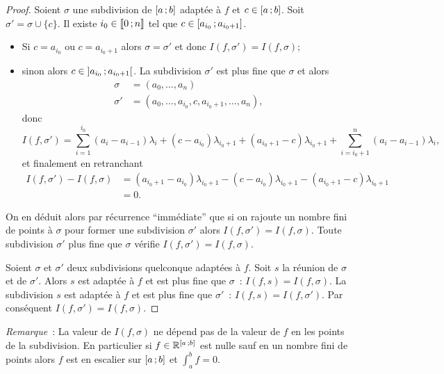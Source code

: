 \begin{proof}
  Soient \(\sigma\) une subdivision de \(\left[ a \, ; {} b \right]\) adaptée à \(f\)
  et \(c \in \left[ a \, ; {} b \right]\). Soit \(\sigma' = \sigma \cup \{c\}\). Il
  existe \(i_0 \in \mathopen{\llbracket}0\mathclose{}\mathpunct{};n\mathclose{\rrbracket}\) tel que \(c \in
  \left[ a_{i_0} \, ; {} a_{i_0+1} \right]\).
  \begin{itemize}
    \item Si \(c=a_{i_0}\) ou \(c=a_{i_0+1}\) alors \(\sigma=\sigma'\) et donc
      \(I(f,\sigma')=I(f,\sigma)\);
    \item sinon alors \(c \in \left] a_{i_0} \, ; {} a_{i_0+1} \right[\). La
      subdivision \(\sigma'\) est plus fine que \(\sigma\) et alors
      \begin{align*}
        \sigma &= (a_0, \ldots, a_n) \\
        \sigma' &= (a_0, \ldots, a_{i_0},c,a_{i_0+1}, \ldots, a_n),
      \end{align*}
      donc
      \begin{equation}
        I(f,\sigma')= \sum_{i=1}^{i_0}(a_i-a_{i-1})\lambda_i +
        (c-a_{i_0})\lambda_{i_0+1} + (a_{i_0+1}-c)\lambda_{i_0+1} +
        \sum_{i=i_0+1}^{n}(a_i-a_{i-1})\lambda_i,
      \end{equation}
      et finalement en retranchant
      \begin{align*}
        I(f,\sigma')-I(f,\sigma)&= (a_{i_0+1}-a_{i_0})\lambda_{i_0+1} -
        (c-a_{i_0})\lambda_{i_0+1} - (a_{i_0+1}-c)\lambda_{i_0+1} \\
        &=0.
      \end{align*}
  \end{itemize}
  On en déduit alors par récurrence ``immédiate''  que si on rajoute un nombre
  fini de points à \(\sigma\) pour former une subdivision \(\sigma'\) alors
  \(I(f,\sigma')=I(f,\sigma)\). Toute subdivision \(\sigma'\) plus fine que
  \(\sigma\) vérifie \(I(f,\sigma')=I(f,\sigma)\).

  Soient \(\sigma\) et \(\sigma'\) deux subdivisions quelconque adaptées à
  \(f\). Soit \(s\) la réunion de \(\sigma\) et de \(\sigma'\). Alors \(s\) est
  adaptée à \(f\) et est plus fine que \(\sigma\)~: \(I(f,s)=I(f,\sigma)\). La
  subdivision \(s\) est adaptée à \(f\) et est plus fine que \(\sigma'\)~:
  \(I(f,s)=I(f,\sigma')\). Par conséquent \(I(f,\sigma')=I(f,\sigma)\).
\end{proof}

\emph{Remarque}~: La valeur de \(I(f,\sigma)\) ne dépend pas de la valeur de
\(f\) en les points de la subdivision. En particulier si \(f \in
\mathbb{R}^{\left[ a \, ; {} b \right]}\) est nulle sauf en un nombre fini de points alors
\(f\) est en escalier sur \(\left[ a \, ; {} b \right]\) et \(\int_a^b f=0\).

